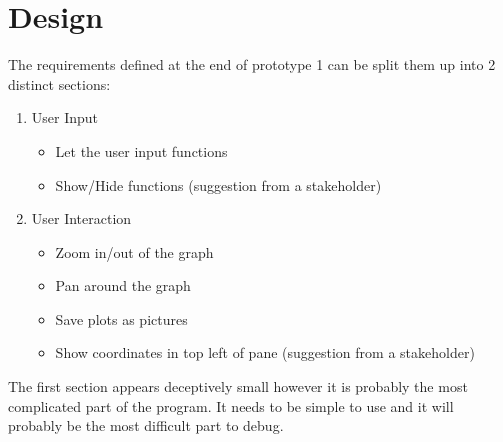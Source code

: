 \documentclass[../../../main.tex]{subfiles}
\begin{document}
\chapter{Design}
The requirements defined at the end of prototype 1 can be split them up into 2 distinct sections:
\begin{enumerate}
\item User Input
\begin{itemize}
	\item Let the user input functions
	\item Show/Hide functions (suggestion from a stakeholder)
	\end{itemize}
\item User Interaction
	\begin{itemize}
	\item Zoom in/out of the graph
	\item Pan around the graph
	\item Save plots as pictures
	\item Show coordinates in top left of pane (suggestion from a stakeholder)
	\end{itemize}
	
\end{enumerate}
The first section appears deceptively small however it is probably the most complicated part of the program. It needs to be simple to use and it will probably be the most difficult part to debug.
\end{document}
